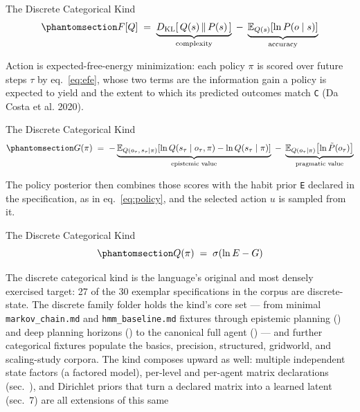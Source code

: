 \documentclass[
  ignorenonframetext,
]{beamer}
\begin{document}
\begin{frame}{The Discrete Categorical Kind}
\begin{equation}\protect\phantomsection\label{eq:vfe}{
F[Q] \;=\; \underbrace{D_{\mathrm{KL}}\!\left[\,Q(s) \,\|\, P(s)\,\right]}_{\text{complexity}} \;-\; \underbrace{\mathbb{E}_{Q(s)}\!\left[\ln P(o \mid s)\right]}_{\text{accuracy}}
}\end{equation}

Action is expected-free-energy minimization: each policy \(\pi\) is
scored over future steps \(\tau\) by eq.~\ref{eq:efe}, whose two terms
are the information gain a policy is expected to yield and the extent to
which its predicted outcomes match \texttt{C} (Da Costa et al. 2020).

\end{frame}

\begin{frame}{The Discrete Categorical Kind}
\begin{equation}\protect\phantomsection\label{eq:efe}{
G(\pi) \;=\; -\underbrace{\mathbb{E}_{Q(o_\tau,\, s_\tau \mid \pi)}\!\left[\ln Q(s_\tau \mid o_\tau, \pi) - \ln Q(s_\tau \mid \pi)\right]}_{\text{epistemic value}} \;-\; \underbrace{\mathbb{E}_{Q(o_\tau \mid \pi)}\!\left[\ln \tilde{P}(o_\tau)\right]}_{\text{pragmatic value}}
}\end{equation}

The policy posterior then combines those scores with the habit prior
\texttt{E} declared in the specification, as in eq.~\ref{eq:policy}, and
the selected action \(u\) is sampled from it.

\end{frame}

\begin{frame}{The Discrete Categorical Kind}
\begin{equation}\protect\phantomsection\label{eq:policy}{
Q(\pi) \;=\; \sigma\!\left(\ln E - G\right)
}\end{equation}

The discrete categorical kind is the language's original and most
densely exercised target: 27 of the 30 exemplar specifications in the
corpus are discrete-state. The discrete family folder holds the kind's
core set --- from minimal \texttt{markov\_chain.md} and
\texttt{hmm\_baseline.md} fixtures through epistemic planning
() and deep planning horizons
() to the canonical full agent
() --- and further categorical fixtures
populate the basics, precision, structured, gridworld, and scaling-study
corpora. The kind composes upward as well: multiple independent state
factors (a factored model), per-level and per-agent matrix declarations
(sec.~), and Dirichlet priors that turn a
declared matrix into a learned latent
(sec.~7) are all extensions of this same
\end{frame}
\end{document}
